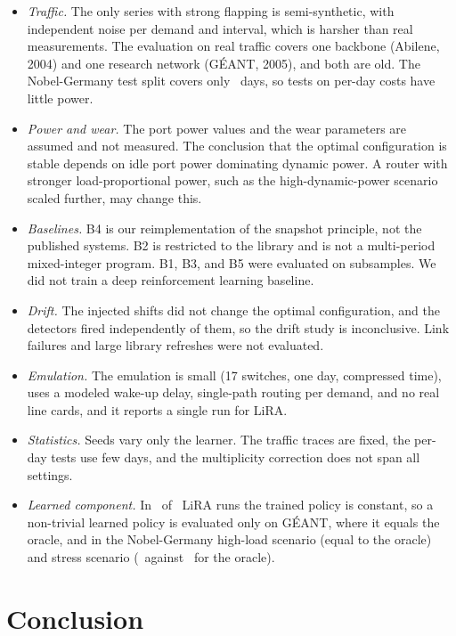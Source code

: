 \documentclass[journal]{IEEEtran}
\begin{document}
\begin{itemize}
\item \emph{Traffic.} The only series with strong flapping is semi-synthetic, with independent noise per demand and interval, which is harsher than real measurements. The evaluation on real traffic covers one backbone (Abilene, 2004) and one research network (G\'{E}ANT, 2005), and both are old. The Nobel-Germany test split covers only \nobTestDays\ days, so tests on per-day costs have little power.
\item \emph{Power and wear.} The port power values and the wear parameters are assumed and not measured. The conclusion that the optimal configuration is stable depends on idle port power dominating dynamic power. A router with stronger load-proportional power, such as the high-dynamic-power scenario scaled further, may change this.
\item \emph{Baselines.} B4 is our reimplementation of the snapshot principle, not the published systems. B2 is restricted to the library and is not a multi-period mixed-integer program. B1, B3, and B5 were evaluated on subsamples. We did not train a deep reinforcement learning baseline.
\item \emph{Drift.} The injected shifts did not change the optimal configuration, and the detectors fired independently of them, so the drift study is inconclusive. Link failures and large library refreshes were not evaluated.
\item \emph{Emulation.} The emulation is small (17 switches, one day, compressed time), uses a modeled wake-up delay, single-path routing per demand, and no real line cards, and it reports a single run for LiRA.
\item \emph{Statistics.} Seeds vary only the learner. The traffic traces are fixed, the per-day tests use few days, and the multiplicity correction does not span all settings.
\item \emph{Learned component.} In \liraConstRuns\ of \liraTotalRuns\ LiRA runs the trained policy is constant, so a non-trivial learned policy is evaluated only on G\'{E}ANT, where it equals the oracle, and in the Nobel-Germany high-load scenario (equal to the oracle) and stress scenario (\ablStressFull\ against \ablStressO\ for the oracle).
\end{itemize}

\section{Conclusion}\label{sec:conclusion}
\end{document}
